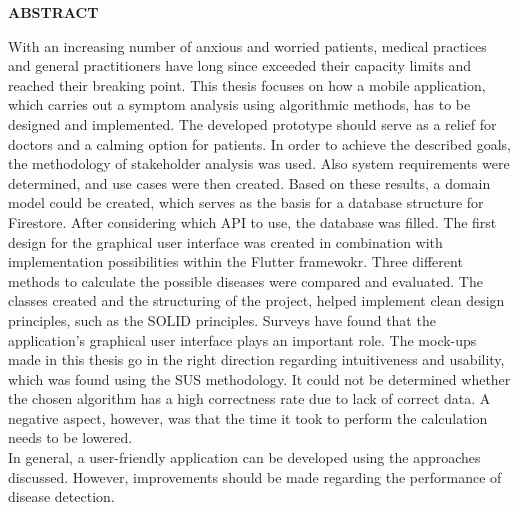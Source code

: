 

{
	\raggedbottom
	\centering
	\vspace{0.9cm}
	\large
	\textbf{ABSTRACT}
		\vspace*{\fill}
		
		With an increasing number of anxious and worried patients, medical practices and general practitioners have long since exceeded their capacity limits and reached their breaking point.
		This thesis focuses on how a mobile application, which carries out a symptom analysis using algorithmic methods, has to be designed and implemented. The developed prototype should serve as a relief for doctors and a calming option for patients. In order to achieve the described goals, the methodology of stakeholder analysis was used. Also system requirements were determined, and use cases were then created. Based on these results, a domain model could be created, which serves as the basis for a database structure for Firestore. After considering which API to use, the database was filled. The first design for the graphical user interface was created in combination with implementation possibilities within the Flutter framewokr. Three different methods to calculate the possible diseases were compared and evaluated. The classes created and the structuring of the project, helped implement clean design principles, such as the SOLID principles. Surveys have found that the application's graphical user interface plays an important role. The mock-ups made in this thesis go in the right direction regarding intuitiveness and usability, which was found using the SUS methodology. It could not be determined whether the chosen algorithm has a high correctness rate due to lack of correct data. A negative aspect, however, was that the time it took to perform the calculation needs to be lowered.
		\newline \\
		In general, a user-friendly application can be developed using the approaches discussed. However, improvements should be made regarding the performance of disease detection.
	
	\vspace*{\fill}
	\pagebreak

	\vspace{0.9cm}
	\large
	
}
